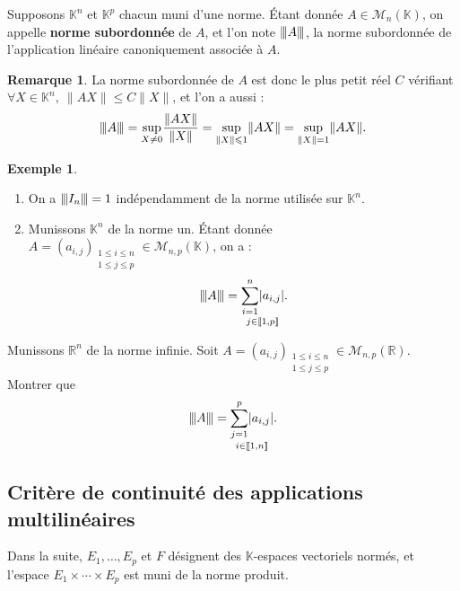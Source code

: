 \documentclass[french]{article}
\newcommand{\R}{\mathbb{R}}
\newcommand{\K}{\mathbb{K}}
\newcommand{\vertiii}[1]{{\left\vert\kern-0.25ex\left\vert\kern-0.25ex\left\vert #1 \right\vert\kern-0.25ex\right\vert\kern-0.25ex\right\vert}}
\theoremstyle{plain}
\theoremstyle{definition}
\newtheorem*{ex}{Exemple}
\newtheorem*{rmq}{Remarque}
\theoremstyle{remark}
\begin{document}
\begin{dfn}
	Supposons $\K^n$ et $\K^p$ chacun muni d'une norme. Étant donnée $A\in\mathcal{M}_n(\K)$, on appelle \textbf{norme subordonnée} de $A$, et l'on note $\vertiii{A}$, la norme subordonnée de l'application linéaire canoniquement associée à $A$.
\end{dfn}

\begin{rmq}
	La norme subordonnée de $A$ est donc le plus petit réel $C$ vérifiant $\forall X\in\K^n,\ \lVert AX\rVert\leqslant C\lVert X\rVert$, et l'on a aussi :
	$$\vertiii{A}=\underset{X\ne 0}{\sup}\frac{\lVert AX\rVert}{\lVert X\rVert}=\underset{\lVert X\rVert\leqslant1}{\sup}\lVert AX\rVert=\underset{\lVert X\rVert=1}{\sup}\lVert AX\rVert.$$
\end{rmq}

\begin{ex}
	\begin{enumerate}
		\item On a $\vertiii{I_n}=1$ indépendamment de la norme utilisée sur $\K^n$.
		\item Munissons $\K^n$ de la norme un. Étant donnée $A=(a_{i,j})_{\substack{1\leqslant i\leqslant n\\ 1\leqslant j\leqslant p}}\in\mathcal{M}_{n,p}(\K)$, on a : $$\vertiii{A}=\underset{j\in\llbracket1,p\rrbracket}{\sum_{i=1}^{n}\lvert a_{i,j}\rvert}.$$
	\end{enumerate}
\end{ex}

\begin{exo}
	Munissons $\R^n$ de la norme infinie. Soit $A=(a_{i,j})_{\substack{1\leqslant i\leqslant n\\ 1\leqslant j\leqslant p}}\in\mathcal{M}_{n,p}(\R)$. Montrer que $$\vertiii{A}=\underset{i\in\llbracket1,n\rrbracket}{\sum_{j=1}^{p}\lvert a_{i,j}\rvert}.$$
\end{exo}

\subsection{Critère de continuité des applications multilinéaires}

Dans la suite, $E_1,\ldots,E_p$ et $F$ désignent des $\K$-espaces vectoriels normés, et l'espace $E_1\times\cdots\times E_p$ est muni de la norme produit.
\end{document}
